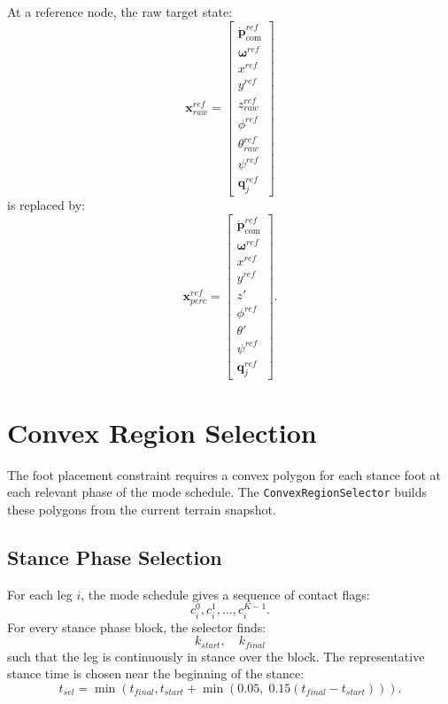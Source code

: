 \documentclass[11pt,a4paper]{article}
\begin{document}
At a reference node, the raw target state:
\begin{equation}
	\bm{x}^{ref}_{raw}
	=
	\begin{bmatrix}
		\dot{\bm{p}}_{\text{com}}^{ref}\\
		\bm{\omega}^{ref}\\
		x^{ref}\\y^{ref}\\z^{ref}_{raw}\\
		\phi^{ref}\\\theta^{ref}_{raw}\\\psi^{ref}\\
		\bm{q}_j^{ref}
	\end{bmatrix}
\end{equation}
is replaced by:
\begin{equation}
	\bm{x}^{ref}_{perc}
	=
	\begin{bmatrix}
		\dot{\bm{p}}_{\text{com}}^{ref}\\
		\bm{\omega}^{ref}\\
		x^{ref}\\y^{ref}\\z'\\
		\phi^{ref}\\\theta'\\\psi^{ref}\\
		\bm{q}_j^{ref}
	\end{bmatrix}.
\end{equation}


\section{Convex Region Selection}
\label{sec:convex_region_selection}

The foot placement constraint requires a convex polygon for each stance foot at each relevant phase of the mode schedule. The \texttt{ConvexRegionSelector} builds these polygons from the current terrain snapshot.

\subsection{Stance Phase Selection}

For each leg $i$, the mode schedule gives a sequence of contact flags:
\begin{equation}
	c_i^0,c_i^1,\ldots,c_i^{K-1}.
\end{equation}
For every stance phase block, the selector finds:
\begin{equation}
	k_{start},\quad k_{final}
\end{equation}
such that the leg is continuously in stance over the block. The representative stance time is chosen near the beginning of the stance:
\begin{equation}
	t_{sel}
	=
	\min\left(
		t_{final},
		t_{start}
		+
		\min(0.05,\;0.15(t_{final}-t_{start}))
	\right).
\end{equation}
\end{document}
